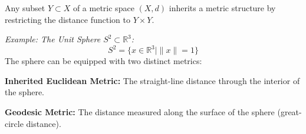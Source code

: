 \begin{math-stroke}
\begin{ai-type-check-invisible-content}
\end{ai-type-check-invisible-content}
Any subset $Y \subset X$ of a metric space $(X, d)$ inherits a metric structure by restricting the distance function to $Y \times Y$.

\emph{Example: The Unit Sphere $S^2 \subset \mathbb{R}^3$:}
\[ S^2 = \{ x \in \mathbb{R}^3 \mid \|x\| = 1 \} \]
The sphere can be equipped with two distinct metrics:

\textbf{Inherited Euclidean Metric:} The straight-line distance through the interior of the sphere.

\textbf{Geodesic Metric:} The distance measured along the surface of the sphere (great-circle distance).

\begin{center}
\end{center}
\end{math-stroke}

